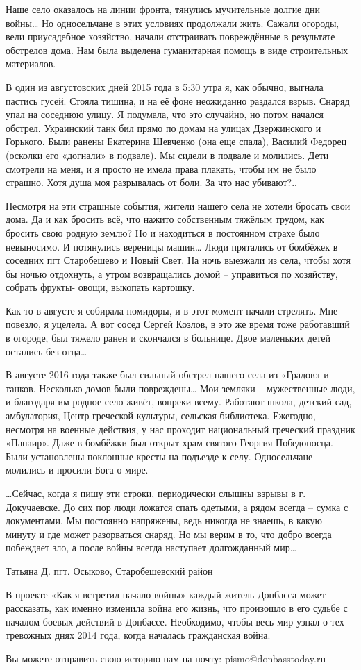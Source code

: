 Наше село оказалось на линии фронта, тянулись мучительные долгие дни войны… Но
односельчане в этих условиях продолжали жить. Сажали огороды, вели приусадебное
хозяйство, начали отстраивать повреждённые в результате обстрелов дома. Нам
была выделена гуманитарная помощь в виде строительных материалов.

В один из августовских дней 2015 года в 5:30 утра я, как обычно, выгнала
пастись гусей. Стояла тишина, и на её фоне неожиданно раздался взрыв. Снаряд
упал на соседнюю улицу. Я подумала, что это случайно, но потом начался обстрел.
Украинский танк бил прямо по домам на улицах Дзержинского и Горького. Были
ранены Екатерина Шевченко (она еще спала), Василий Федорец (осколки его
«догнали» в подвале). Мы сидели в подвале и молились. Дети смотрели на меня, и
я просто не имела права плакать, чтобы им не было страшно. Хотя душа моя
разрывалась от боли. За что нас убивают?..

Несмотря на эти страшные события, жители нашего села не хотели бросать свои
дома. Да и как бросить всё, что нажито собственным тяжёлым трудом, как бросить
свою родную землю? Но и находиться в постоянном страхе было невыносимо. И
потянулись вереницы машин… Люди прятались от бомбёжек в соседних пгт
Старобешево и Новый Свет. На ночь выезжали из села, чтобы хотя бы ночью
отдохнуть, а утром возвращались домой – управиться по хозяйству, собрать
фрукты- овощи, выкопать картошку.

Как-то в августе я собирала помидоры, и в этот момент начали стрелять. Мне
повезло, я уцелела. А вот сосед Сергей Козлов, в это же время тоже работавший в
огороде, был тяжело ранен и скончался в больнице. Двое маленьких детей остались
без отца…

В августе 2016 года также был сильный обстрел нашего села из «Градов» и танков.
Несколько домов были повреждены… Мои земляки – мужественные люди, и благодаря
им родное село живёт, вопреки всему. Работают школа, детский сад, амбулатория,
Центр греческой культуры, сельская библиотека. Ежегодно, несмотря на военные
действия, у нас проходит национальный греческий праздник «Панаир». Даже в
бомбёжки был открыт храм святого Георгия Победоносца. Были установлены
поклонные кресты на подъезде к селу. Односельчане молились и просили Бога о
мире.

…Сейчас, когда я пишу эти строки, периодически слышны взрывы в г. Докучаевске.
До сих пор люди ложатся спать одетыми, а рядом всегда – сумка с документами. Мы
постоянно напряжены, ведь никогда не знаешь, в какую минуту и где может
разорваться снаряд. Но мы верим в то, что добро всегда побеждает зло, а после
войны всегда наступает долгожданный мир…

Татьяна Д. пгт. Осыково, Старобешевский район

В проекте «Как я встретил начало войны» каждый житель Донбасса может
рассказать, как именно изменила война его жизнь, что произошло в его судьбе с
началом боевых действий в Донбассе. Необходимо, чтобы весь мир узнал о тех
тревожных днях 2014 года, когда началась гражданская война.

Вы можете отправить свою историю нам на почту: pismo@donbasstoday.ru
